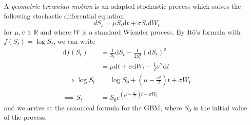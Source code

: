 \begin{definition}
    A \emph{geometric brownian motion} is an adapted stochastic process which solves the following
    stochastic differential equation
    \begin{equation}
        dS_t=\mu S_t\mathrm dt + \sigma S_t\mathrm dW_t
    \end{equation}
    for $\mu,\sigma\in\mathbb{R}$ and where $W$ is a standard Wiender process.
    By It\^{o}'s formula with $f(S_t)=\log S_t$, we can write
    \begin{align*}
        \mathrm df(S_t)&=\frac{1}{S_t}\mathrm dS_t-\frac{1}{2S_t^2}(\mathrm dS_t)^2\\
        &=\mu\mathrm dt+\sigma\mathrm dW_t-\frac{1}{2}\sigma^2\mathrm dt\\
        \implies \log S_t&=\log S_0+\left(\mu-\frac{\sigma^2}{2}\right)t+\sigma W_t\\
        \implies S_t&=S_0e^{\left(\mu-\frac{\sigma^2}{2}\right)t+\sigma W_t}
    \end{align*}
    and we arrive at the canonical formula for the GBM, where $S_0$ is the initial value of the process.
\end{definition}
